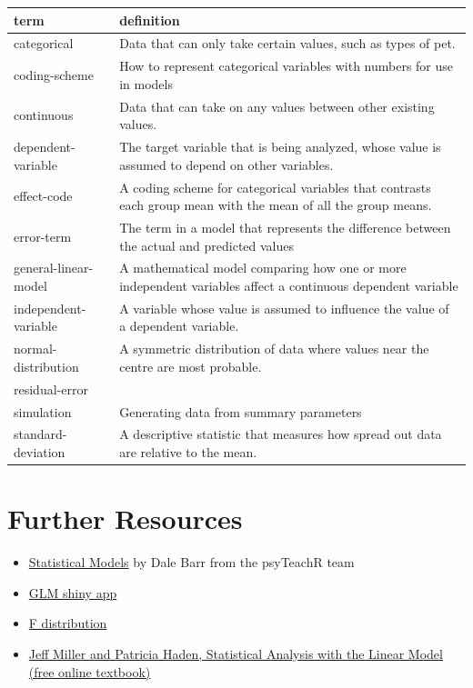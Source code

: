 \documentclass[
  oneside]{book}
\providecommand{\tightlist}{%
  \setlength{\itemsep}{0pt}\setlength{\parskip}{0pt}}
\begin{document}
\begin{tabular}{l|l}
\hline
term & definition\\
\hline
categorical & Data that can only take certain values, such as types of pet.\\
\hline
coding-scheme & How to represent categorical variables with numbers for use in models\\
\hline
continuous & Data that can take on any values between other existing values.\\
\hline
dependent-variable & The target variable that is being analyzed, whose value is assumed to depend on other variables.\\
\hline
effect-code & A coding scheme for categorical variables that contrasts each group mean with the mean of all the group means.\\
\hline
error-term & The term in a model that represents the difference between the actual and predicted values\\
\hline
general-linear-model & A mathematical model comparing how one or more independent variables affect a continuous dependent variable\\
\hline
independent-variable & A variable whose value is assumed to influence the value of a dependent variable.\\
\hline
normal-distribution & A symmetric distribution of data where values near the centre are most probable.\\
\hline
residual-error & \\
\hline
simulation & Generating data from summary parameters\\
\hline
standard-deviation & A descriptive statistic that measures how spread out data are relative to the mean.\\
\hline
\end{tabular}

\hypertarget{resources-glm}{%
\section{Further Resources}\label{resources-glm}}

\begin{itemize}
\tightlist
\item
  \href{https://psyteachr.github.io/stat-models-v1/}{Statistical Models} by Dale Barr from the psyTeachR team
\item
  \href{http://rstudio2.psy.gla.ac.uk/Dale/GLM}{GLM shiny app}
\item
  \href{http://rstudio2.psy.gla.ac.uk/Dale/fdist}{F distribution}
\item
  \href{http://www.otago.ac.nz/psychology/otago039309.pdf}{Jeff Miller and Patricia Haden, Statistical Analysis with the Linear Model (free online textbook)}
\end{itemize}
\end{document}
